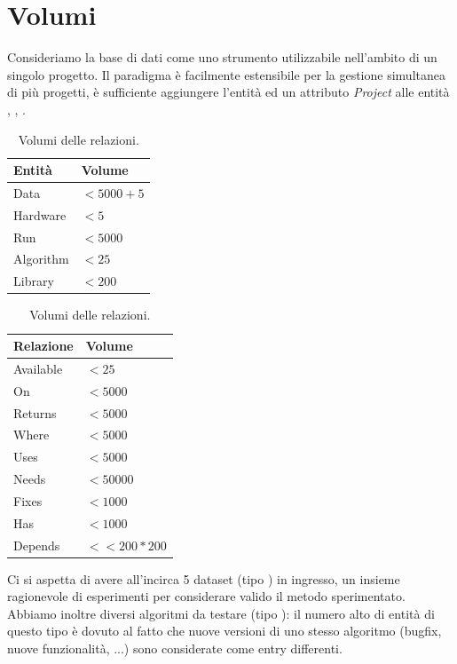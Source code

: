 \documentclass{article}
\begin{document}
\section{Volumi}
Consideriamo la base di dati come uno strumento utilizzabile nell'ambito di un singolo progetto. Il paradigma è facilmente estensibile per la gestione simultanea di più progetti, è sufficiente aggiungere l'entità  ed un attributo \emph{Project} alle entità , , .
\begin{table}[H]
    \begin{minipage}[b]{.5\linewidth}
      \centering
      \begin{tabular}{||l l||}
        \hline
        Entità & Volume \\ [0.5ex]
        \hline\hline
        Data & $<5000 + 5$\\
        Hardware & $<5$\\
        Run & $<5000$\\
        Algorithm & $<25$\\
        Library & $<200$\\
        \hline
       \end{tabular}
       \caption{Volumi delle entità.}
    \end{minipage}
    \begin{minipage}[b]{.5\linewidth}
      \centering
        \begin{tabular}{||l l||}
            \hline
            Relazione & Volume \\ [0.5ex]
            \hline\hline
            Available & $<25$\\
            On & $<5000$\\
            Returns & $<5000$\\
            Where & $<5000$\\
            Uses & $<5000$\\
            Needs & $<50000$\\
            Fixes & $<1000$\\
            Has & $<1000$\\
            Depends & $<<200*200$\\
            \hline
           \end{tabular}
           \caption{Volumi delle relazioni.}
    \end{minipage}
\end{table}

Ci si aspetta di avere all'incirca 5 dataset (tipo ) in ingresso, un insieme ragionevole di esperimenti per considerare valido il metodo sperimentato. Abbiamo inoltre diversi algoritmi da testare  (tipo ): il numero alto di entità di questo tipo è dovuto al fatto che nuove versioni di uno stesso algoritmo (bugfix, nuove funzionalità, ...) sono considerate come entry differenti.
\end{document}
